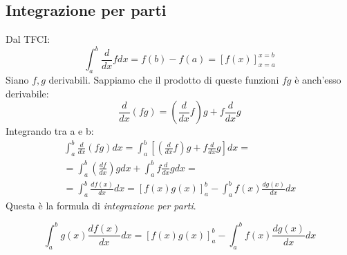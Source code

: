 \subsection{Integrazione per parti}
Dal TFCI:
\begin{equation}
    \int_{a}^{b} \frac{d}{dx}f dx = f(b)-f(a) = [ f(x) ]^{x=b}_{x=a}
\end{equation}
Siano $f,g$ derivabili. Sappiamo che il prodotto di queste funzioni $fg$ è anch'esso derivabile:
\begin{equation}
    \frac{d}{dx}(fg) = \left(\frac{d}{dx}f\right)g + f \frac{d}{dx}g
\end{equation}
Integrando tra a e b:
\begin{gather}
    \int_{a}^{b} \frac{d}{dx}(fg) dx = \int_{a}^{b} \left[\left( \frac{d}{dx}f\right)g + f \frac{d}{dx}g\right] dx = \\
    = \int_{a}^{b} ( \frac{df}{dx})g dx + \int_{a}^{b} f \frac{d}{dx}g dx = \\
    = \int_{a}^{b} \frac{df(x)}{dx} dx = [f(x)g(x)]_a^b - \int_{a}^{b} f(x) \frac{dg(x)}{dx} dx
\end{gather}
Questa è la formula di \textit{integrazione per parti}.

\begin{definizione}
    \begin{equation}
    \int_{a}^{b} g(x) \frac{df(x)}{dx} dx = [f(x)g(x)]_a^b - \int_{a}^{b} f(x) \frac{dg(x)}{dx} dx
    \end{equation}
\end{definizione}
\leavevmode \\

